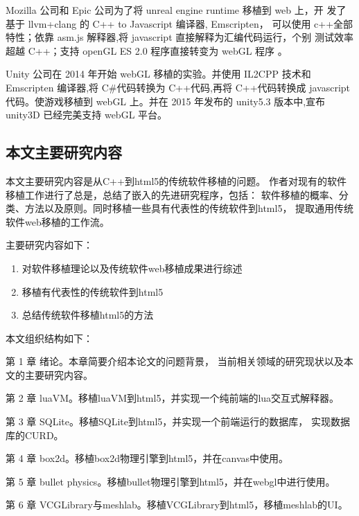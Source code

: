Mozilla 公司和 Epic 公司为了将 unreal engine runtime 移植到 web 上，开
发了基于 llvm+clang 的 C++ to Javascript 编译器, Emscripten，
可以使用 c++全部特性；依靠 asm.js 解释器,将 javascript 直接解释为汇编代码运行，个别
测试效率超越 C++；支持 openGL ES 2.0 程序直接转变为 webGL 程序 。

Unity 公司在 2014 年开始 webGL 移植的实验。并使用 IL2CPP 技术和 Emscripten 编译器,将 C\#代码转换为 C++代码,再将 C++代码转换成 javascript 代码。使游戏移植到 webGL 上。并在 2015 年发布的 unity5.3 版本中,宣布 unity3D 已经完美支持 webGL 平台。


\subsection{本文主要研究内容}

本文主要研究内容是从C++到html5的传统软件移植的问题。
作者对现有的软件移植工作进行了总是，总结了嵌入的先进研究程序，包括：
软件移植的概率、分类、方法以及原则。同时移植一些具有代表性的传统软件到html5，
提取通用传统软件web移植的工作流。

主要研究内容如下：

\begin{enumerate}
    \item 对软件移植理论以及传统软件web移植成果进行综述
    \item 移植有代表性的传统软件到html5
    \item 总结传统软件移植html5的方法
\end{enumerate}

本文组织结构如下：

{\heiti 第 1 章 } 绪论。本章简要介绍本论文的问题背景，
当前相关领域的研究现状以及本文的主要研究内容。

{\heiti 第 2 章 } luaVM。移植luaVM到html5，并实现一个纯前端的lua交互式解释器。

{\heiti 第 3 章 } SQLite。移植SQLite到html5，并实现一个前端运行的数据库，
实现数据库的CURD。

{\heiti 第 4 章 } box2d。移植box2d物理引擎到html5，并在canvas中使用。

{\heiti 第 5 章 } bullet physics。移植bullet物理引擎到html5，并在webgl中进行使用。

{\heiti 第 6 章 } VCGLibrary与meshlab。移植VCGLibrary到html5，移植meshlab的UI。

